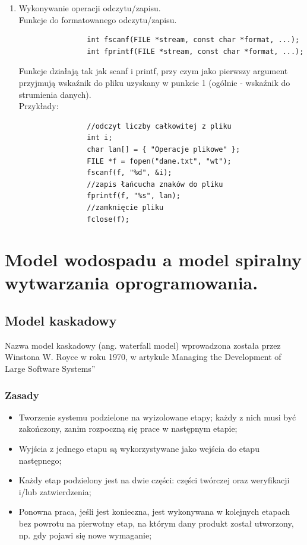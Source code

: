 \documentclass[12pt]{article}
\begin{document}
\begin{enumerate}
        \item     
            Wykonywanie operacji odczytu/zapisu.\\
            Funkcje do formatowanego odczytu/zapisu.
            \begin{verbatim}
                int fscanf(FILE *stream, const char *format, ...);
                int fprintf(FILE *stream, const char *format, ...);
            \end{verbatim}
            Funkcje działają tak jak scanf i printf, przy czym jako pierwszy argument przyjmują
            wskaźnik do pliku uzyskany w punkcie 1 (ogólnie - wskaźnik do strumienia danych).\\
            Przykłady:
            \begin{verbatim}
                //odczyt liczby całkowitej z pliku
                int i;
                char lan[] = { "Operacje plikowe" };
                FILE *f = fopen("dane.txt", "wt");
                fscanf(f, "%d", &i);
                //zapis łańcucha znaków do pliku
                fprintf(f, "%s", lan);
                //zamknięcie pliku
                fclose(f);
            \end{verbatim}
        
    \end{enumerate}

    \newpage
    
    \section{Model wodospadu a model spiralny wytwarzania oprogramowania.}
    
    \subsection{Model kaskadowy}
    Nazwa model kaskadowy (ang. waterfall model) wprowadzona została przez Winstona W. Royce w roku 1970, w artykule Managing the Development of Large Software Systems”
        
    \subsubsection{Zasady}
    \begin{itemize}
        \item Tworzenie systemu podzielone na wyizolowane
        etapy; każdy z nich musi być zakończony, zanim
        rozpoczną się prace w następnym etapie;
        \item Wyjścia z jednego etapu są wykorzystywane jako
        wejścia do etapu następnego;
        \item Każdy etap podzielony jest na dwie części: części
        twórczej oraz weryfikacji i/lub zatwierdzenia;
        \item Ponowna praca, jeśli jest konieczna, jest
        wykonywana w kolejnych etapach bez powrotu na
        pierwotny etap, na którym dany produkt został
        utworzony, np. gdy pojawi się nowe wymaganie;
    \end{itemize}
        
\end{document}

